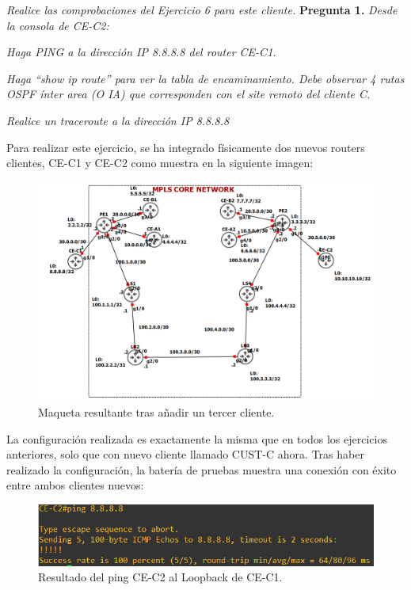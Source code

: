\documentclass[a4paper, 12pt]{report}
\begin{document}
\textit{Realice las comprobaciones del Ejercicio 6 para este cliente.}
\newpage
\textbf{Pregunta 1.}
\textit{Desde la consola de CE-C2:}

\textit{Haga PING a la dirección IP 8.8.8.8 del router CE-C1.}

\textit{Haga “show ip route” para ver la tabla de encaminamiento. Debe observar 4 rutas
OSPF ínter area (O IA) que corresponden con el site remoto del cliente C.}

\textit{Realice un traceroute a la dirección IP 8.8.8.8}

Para realizar este ejercicio, se ha integrado físicamente dos nuevos routers clientes, CE-C1 y CE-C2 como muestra en la siguiente imagen:
\begin{figure}[H]
	\centering
	\includegraphics[scale=0.4]{maqueta3.png}
	\caption{Maqueta resultante tras añadir un tercer cliente.}
	\label{fig:maqueta3}
\end{figure}

La configuración realizada es exactamente la misma que en todos los ejercicios anteriores, solo que con nuevo cliente llamado CUST-C ahora.
Tras haber realizado la configuración, la batería de pruebas muestra una conexión con éxito entre ambos clientes nuevos:

\begin{figure}[H]
	\centering
	\includegraphics[scale=0.6]{ping8888.png}
	\caption{Resultado del ping CE-C2 al Loopback de CE-C1.}
	\label{fig:ping8888}
\end{figure}
\end{document}
